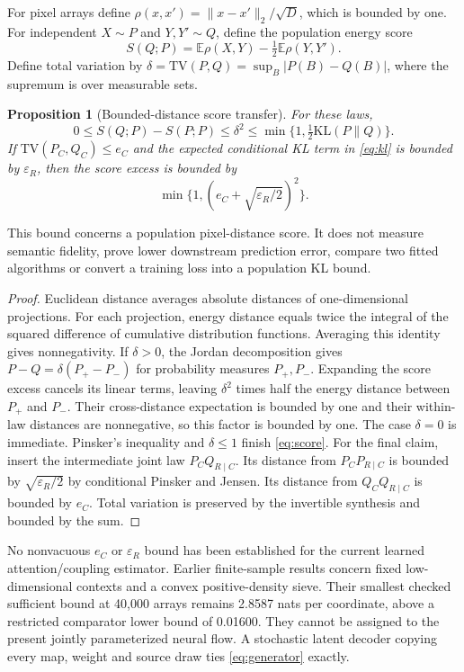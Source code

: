 \documentclass[11pt]{article}
\newtheorem{proposition}{Proposition}
\newcommand{\E}{\mathbb E}
\begin{document}
For pixel arrays define $\rho(x,x')=\|x-x'\|_2/\sqrt D$, which is bounded by one. For independent $X\sim P$ and $Y,Y'\sim Q$, define the population energy score
\begin{equation}
 S(Q;P)=\E\rho(X,Y)-\tfrac12\E\rho(Y,Y').
\end{equation}
Define total variation by $\delta=\mathrm{TV}(P,Q)=\sup_B|P(B)-Q(B)|$, where the supremum is over measurable sets.
\begin{proposition}[Bounded-distance score transfer]\label{prop:score}
For these laws,
\begin{equation}\label{eq:score}
 0\le S(Q;P)-S(P;P)\le\delta^2
    \le\min\{1,\tfrac12\mathrm{KL}(P\|Q)\}.
\end{equation}
If $\mathrm{TV}(P_C,Q_C)\le e_C$ and the expected conditional KL term in \eqref{eq:kl} is bounded by $\varepsilon_R$, then the score excess is bounded by
\begin{equation}
 \min\{1,(e_C+\sqrt{\varepsilon_R/2})^2\}.
\end{equation}
\end{proposition}
This bound concerns a population pixel-distance score. It does not measure semantic fidelity, prove lower downstream prediction error, compare two fitted algorithms or convert a training loss into a population KL bound.
\begin{proof}
Euclidean distance averages absolute distances of one-dimensional projections. For each projection, energy distance equals twice the integral of the squared difference of cumulative distribution functions. Averaging this identity gives nonnegativity. If $\delta>0$, the Jordan decomposition gives $P-Q=\delta(P_+-P_-)$ for probability measures $P_+,P_-$. Expanding the score excess cancels its linear terms, leaving $\delta^2$ times half the energy distance between $P_+$ and $P_-$. Their cross-distance expectation is bounded by one and their within-law distances are nonnegative, so this factor is bounded by one. The case $\delta=0$ is immediate. Pinsker's inequality and $\delta\le1$ finish \eqref{eq:score}. For the final claim, insert the intermediate joint law $P_CQ_{R\mid C}$. Its distance from $P_CP_{R\mid C}$ is bounded by $\sqrt{\varepsilon_R/2}$ by conditional Pinsker and Jensen. Its distance from $Q_CQ_{R\mid C}$ is bounded by $e_C$. Total variation is preserved by the invertible synthesis and bounded by the sum.
\end{proof}

No nonvacuous $e_C$ or $\varepsilon_R$ bound has been established for the current learned attention/coupling estimator. Earlier finite-sample results concern fixed low-dimensional contexts and a convex positive-density sieve. Their smallest checked sufficient bound at 40,000 arrays remains 2.8587 nats per coordinate, above a restricted comparator lower bound of 0.01600. They cannot be assigned to the present jointly parameterized neural flow. A stochastic latent decoder copying every map, weight and source draw ties \eqref{eq:generator} exactly.
\end{document}
